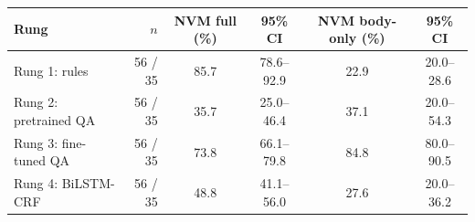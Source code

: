 \begin{tabular}{lrcccc}
\hline
Rung & $n$ & NVM full (\%) & 95\% CI & NVM body-only (\%) & 95\% CI \\
\hline
Rung 1: rules & 56 / 35 & 85.7 & 78.6--92.9 & 22.9 & 20.0--28.6 \\
Rung 2: pretrained QA & 56 / 35 & 35.7 & 25.0--46.4 & 37.1 & 20.0--54.3 \\
Rung 3: fine-tuned QA & 56 / 35 & 73.8 & 66.1--79.8 & 84.8 & 80.0--90.5 \\
Rung 4: BiLSTM-CRF & 56 / 35 & 48.8 & 41.1--56.0 & 27.6 & 20.0--36.2 \\
\hline
\end{tabular}
